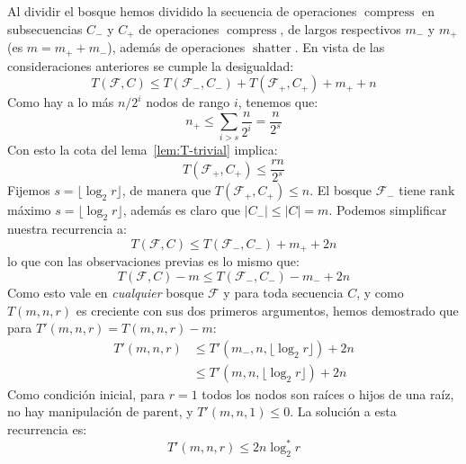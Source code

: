   Al dividir el bosque hemos dividido
  la secuencia de operaciones \(\operatorname{compress}\)
  en subsecuencias \(C_-\) y \(C_+\)
  de operaciones \(\operatorname{compress}\),
  de largos respectivos \(m_-\) y \(m_+\)
  (es \(m = m_+ + m_-\)),
  además de operaciones \(\operatorname{shatter}\).
  En vista de las consideraciones anteriores se cumple la desigualdad:
  \begin{equation}
    \label{eq:desigualdad-T}
    T(\mathscr{F}, C)
      \le T(\mathscr{F}_-, C_-) + T(\mathscr{F}_+, C_+) + m_+ + n
  \end{equation}
  Como hay a lo más \(n / 2^i\) nodos de rango \(i\),
  tenemos que:
  \begin{equation*}
    n_+
      \le \sum_{i > s} \frac{n}{2^i}
      = \frac{n}{2^s}
  \end{equation*}
  Con esto la cota del lema~\ref{lem:T-trivial}
  implica:
  \begin{equation*}
    T(\mathscr{F}_+, C_+)
      \le \frac{r n}{2^s}
  \end{equation*}
  Fijemos \(s = \lfloor \log_2 r \rfloor\),
  de manera que \(T(\mathscr{F}_+, C_+) \le n\).
  El bosque \(\mathscr{F}_-\)
  tiene \(\mathrm{rank}\) máximo \(s = \lfloor \log_2 r \rfloor\),
  además es claro que \(\lvert C_- \rvert \le \lvert C \rvert = m\).
  Podemos simplificar nuestra recurrencia a:
  \begin{equation*}
    T(\mathscr{F}, C)
      \le T(\mathscr{F}_-, C_-) + m_+ + 2 n
  \end{equation*}
  lo que con las observaciones previas es lo mismo que:
  \begin{equation*}
    T(\mathscr{F}, C) - m
      \le T(\mathscr{F}_-, C_-) - m_- + 2 n
  \end{equation*}
  Como esto vale en \emph{cualquier} bosque \(\mathscr{F}\)
  y para toda secuencia \(C\),
  y como \(T(m, n, r)\) es creciente con sus dos primeros argumentos,
  hemos demostrado que
  para \(T'(m, n, r) = T(m, n, r) - m\):
  \begin{align*}
    T'(m, n, r)
      &\le T'(m_-, n, \lfloor \log_2 r \rfloor) + 2 n \\
      &\le T'(m, n, \lfloor \log_2 r \rfloor) + 2 n
  \end{align*}
  Como condición inicial,
  para \(r = 1\) todos los nodos son raíces o hijos de una raíz,
  no hay manipulación de \(\mathrm{parent}\),
  y \(T'(m, n, 1) \le 0\).
  La solución a esta recurrencia es:
  \begin{equation*}
    T'(m, n, r)
      \le 2 n \log_2^* r
  \end{equation*}

